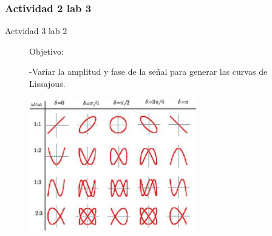 \subsubsection{Actividad 2 lab 3}
\begin{frame}{Actvidad 3 lab 2}
\begin{figure}[H]
\begin{flushleft}
Objetivo:
\end{flushleft}
\begin{flushleft}
-Variar la  amplitud y fase de la señal para generar las curvas de Lissajous.
\end{flushleft}

\begin{center}
\centering
\includegraphics[width=0.65\textwidth]{parte1/lab2/pdf/lab2_19.pdf}
\end{center}
\end{figure}
\end{frame}
